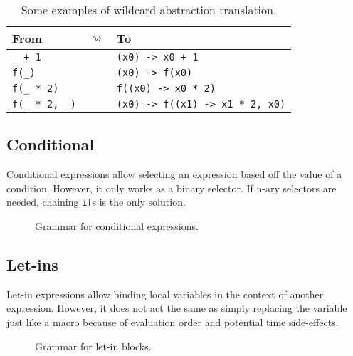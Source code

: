\begin{table}[htb]
  \begin{tabularx}{\textwidth}{YcY}
    \toprule
    From &  & To \\
    \midrule
    \verb|_ + 1| && \verb|(x0) -> x0 + 1| \\
    \verb|f(_)| && \verb|(x0) -> f(x0)| \\
    \verb|f(_ * 2)| && \verb|f((x0) -> x0 * 2)| \\
    \verb|f(_ * 2, _)| && \verb|(x0) -> f((x1) -> x1 * 2, x0)| \\
    \bottomrule
  \end{tabularx}

  \caption{Some examples of wildcard abstraction translation.}
  \label{table:zilch-grammar-expressions-lambda-translatewildcard}
\end{table}

\subsection{Conditional}\label{subsec:zilch-grammar-expressions-conditional}

Conditional expressions allow selecting an expression based off the value of a condition.
However, it only works as a binary selector.
If n-ary selectors are needed, chaining \texttt{if}s is the only solution.

\begin{figure}[H]
  \centering


  \caption{Grammar for conditional expressions.}
  \label{fig:zilch-gramma-expressions-conditional-grammar}
\end{figure}

\subsection{Let-ins}\label{subsec:zilch-grammar-expressions-letin}

Let-in expressions allow binding local variables in the context of another expression.
However, it does not act the same as simply replacing the variable just like a macro because of evaluation order and potential time side-effects.

\begin{figure}[H]
  \centering


  \caption{Grammar for let-in blocks.}
  \label{fig:zilch-grammar-expressions-letin-grammar}
\end{figure}

